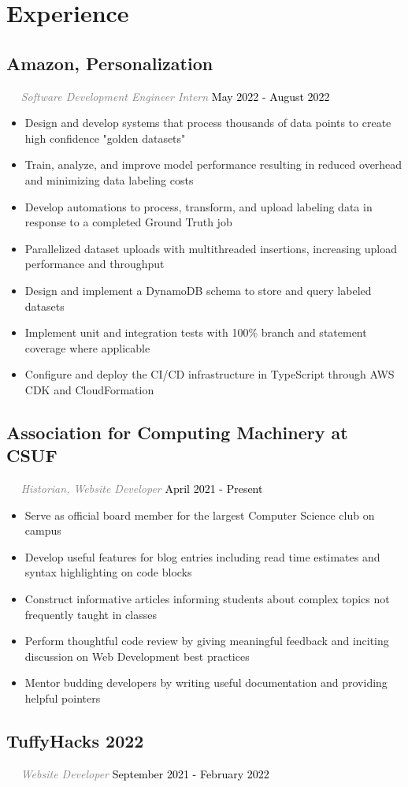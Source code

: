 \documentclass{article}
\newcommand{\resumesection}[3]{
    \subsection*{#1}
    \ 
    \ 
    \small
    \textcolor{grey}{\emph{#2}}
    \normalsize
    \hfill
    \textcolor{black}{#3}
    \normalsize
}
\begin{document}
\section*{Experience}
\resumesection{Amazon, Personalization}{Software Development Engineer Intern}{May 2022 - August 2022}
\begin{itemize}
    \item Design and develop systems that process thousands of data points to create high confidence "golden datasets"
    \item Train, analyze, and improve model performance resulting in reduced overhead and minimizing data labeling costs
    \item Develop automations to process, transform, and upload labeling data in response to a completed Ground Truth job
    \item Parallelized dataset uploads with multithreaded insertions, increasing upload performance and throughput
    \item Design and implement a DynamoDB schema to store and query labeled datasets
    \item Implement unit and integration tests with 100\% branch and statement coverage where applicable
    \item Configure and deploy the CI/CD infrastructure in TypeScript through AWS CDK and CloudFormation
\end{itemize}
\resumesection{Association for Computing Machinery at CSUF}{Historian, Website Developer}{April 2021 - Present}
\begin{itemize}
    \item Serve as official board member for the largest Computer Science club on campus
    \item Develop useful features for blog entries including read time estimates and syntax highlighting on code blocks
    \item Construct informative articles informing students about complex topics not frequently taught in classes
    \item Perform thoughtful code review by giving meaningful feedback and inciting discussion on Web Development best practices
    \item Mentor budding developers by writing useful documentation and providing helpful pointers
\end{itemize}
\resumesection{TuffyHacks 2022}{Website Developer}{September 2021 - February 2022}
\end{document}
